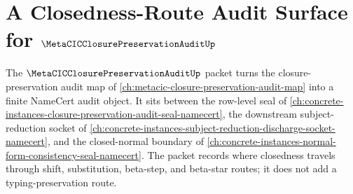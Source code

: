 \chapter{A Closedness-Route Audit Surface for $\MetaCICClosurePreservationAuditUp$}
\label{ch:concrete-instances-metacic-closure-preservation-audit-namecert}

The $\MetaCICClosurePreservationAuditUp$ packet turns the closure-preservation audit map of \autoref{ch:metacic-closure-preservation-audit-map} into a finite NameCert audit object. It sits between the row-level seal of \autoref{ch:concrete-instances-closure-preservation-audit-seal-namecert}, the downstream subject-reduction socket of \autoref{ch:concrete-instances-subject-reduction-discharge-socket-namecert}, and the closed-normal boundary of \autoref{ch:concrete-instances-normal-form-consistency-seal-namecert}. The packet records where closedness travels through shift, substitution, beta-step, and beta-star routes; it does not add a typing-preservation route.

